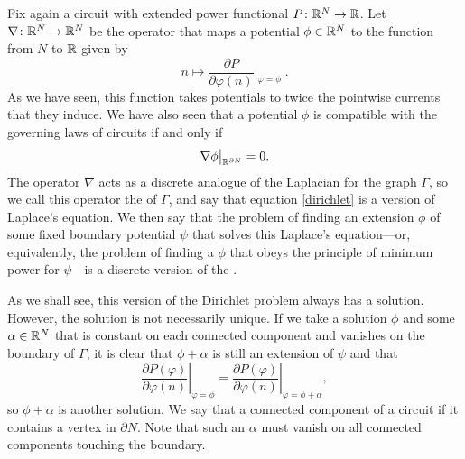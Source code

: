 Fix again a circuit with extended power functional $P{\colon} {\mathbb{R}}^N \to {\mathbb{R}}$. Let $\nabla{\colon} {\mathbb{R}}^{N} \to {\mathbb{R}}^{N}$ be the operator that maps a potential $\phi \in {\mathbb{R}}^N$ to the function from $N$ to ${\mathbb{R}}$ given by
\[
n \longmapsto \frac{\partial P}{\partial \varphi(n)}\bigg|_{\varphi = \phi} \;.
\]
As we have seen, this function takes potentials to twice the pointwise currents that they induce. We have also seen that a potential $\phi$ is compatible with the governing laws of circuits if and only if
\begin{equation}
\nabla \phi \big|_{{\mathbb{R}}^{\partial N}} = 0 .\label{dirichlet}
\end{equation}
The operator $\nabla$ acts as a discrete analogue of the Laplacian for the graph $\Gamma$, so we call this operator the  of $\Gamma$, and say that  equation \eqref{dirichlet} is a version of Laplace's equation. We then say that the problem of finding an extension $\phi$ of some fixed boundary potential $\psi$ that solves this Laplace's equation---or, equivalently, the problem of finding a $\phi$ that obeys the principle of minimum power for $\psi$---is a discrete version of the . 

As we shall see, this version of the Dirichlet problem always has a solution.  However, the solution is not necessarily unique.  If we take a solution $\phi$ and some $\alpha \in {\mathbb{R}}^N$ that is constant on each connected component and vanishes on the boundary of $\Gamma$, it is clear that $\phi+\alpha$ is still an extension of $\psi$ and that 
\[
\left.\frac{\partial P(\varphi)}{\partial \varphi(n)}\right|_{\varphi = \phi} = 
\left.\frac{\partial P(\varphi)}{\partial \varphi(n)}\right|_{\varphi = \phi + \alpha},
\] 
so $\phi + \alpha$ is another solution. We say that a connected component of a circuit  if it contains a vertex in $\partial N$. Note that such an $\alpha$ must vanish on all connected components touching the boundary.

